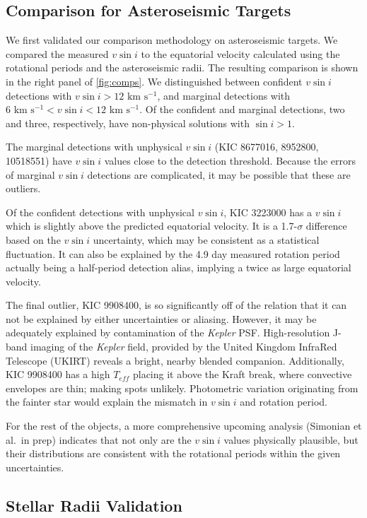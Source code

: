 \documentclass[manuscript]{aastex6}
\newcommand{\vsini}{\ensuremath{v \sin i}}
\newcommand{\Kepler}{\mbox{\textit{Kepler}}}
\newcommand{\Teff}{\ensuremath{T_{eff}}}
\newcommand{\kms}{\textrm{~km~s}\ensuremath{^{-1}}}
\begin{document}
\subsection{Comparison for Asteroseismic Targets}
\label{sec:astero}

We first validated our comparison methodology on asteroseismic targets. We 
compared the measured \vsini{} to the equatorial velocity calculated
using the rotational periods and the asteroseismic radii. The resulting 
comparison is shown in the right panel of \cref{fig:comps}. We distinguished 
between confident \vsini{} detections with \(\vsini > 12 \kms\), and marginal 
detections with \(6 \kms < \vsini < 12 \kms\). Of the confident and
marginal detections, two and three, respectively, have non-physical solutions 
with \(\sin i > 1\). 

The marginal detections with unphysical \vsini{} (KIC 8677016, 8952800, 10518551) 
have \vsini{} values close to the detection threshold. Because the errors of 
marginal \vsini{} detections are complicated, it may be possible that these 
are outliers. 

Of the confident detections with unphysical \vsini{}, KIC 3223000 has a
\vsini{} which is slightly above the predicted equatorial velocity. It
is a 1.7-\(\sigma\) difference based on the \vsini{} uncertainty, which
may be consistent as a statistical fluctuation. It can also
be explained by the 4.9 day measured rotation period actually being a 
half-period detection alias, implying a twice as large equatorial velocity. 

The final outlier, KIC 9908400, is so significantly off of the relation
that it can not be explained by either uncertainties or aliasing. However,
it may be adequately explained by contamination of the \Kepler{} PSF\@. 
High-resolution J-band imaging of the \Kepler{} field, provided by the United
Kingdom InfraRed Telescope (UKIRT) reveals a bright, nearby blended companion.
Additionally, KIC 9908400 has a high \Teff{} placing it above the Kraft
break, where convective envelopes are thin;
making spots unlikely. Photometric variation originating from the fainter 
star would explain the mismatch in \vsini{} and rotation period.

For the rest of the objects, a more comprehensive upcoming analysis 
(Simonian et al.\ in prep) indicates that not only are the \vsini{} values 
physically plausible, but their distributions are consistent with the
rotational periods within the given uncertainties.

\subsection{Stellar Radii Validation}
\label{sec:radii}
\end{document}
